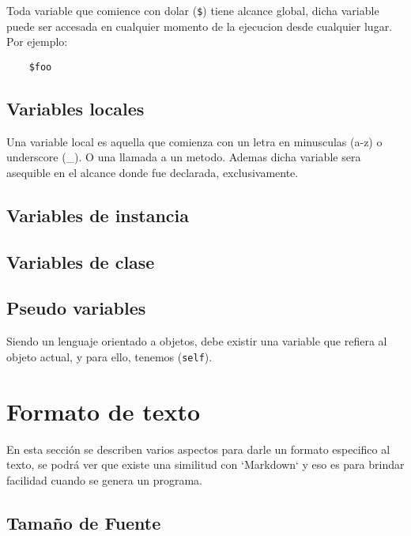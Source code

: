 \documentclass[12pt,letterpaper,titlepage,oneside,openright]{book}
\newcommand{\ttcode}[1]{(\texttt{#1})}
\begin{document}
Toda variable que comience con dolar \ttcode{\$} tiene alcance global, dicha
variable puede ser accesada en cualquier momento de la ejecucion desde cualquier
lugar. Por ejemplo:

\begin{center}
\begin{lstlisting}
    $foo
\end{lstlisting}
\end{center}

\subsection{Variables locales}

Una variable local es aquella que comienza con un letra en minusculas (a-z) o
underscore (\_). O una llamada a un metodo. Ademas dicha variable sera asequible
en el alcance donde fue declarada, exclusivamente.

\subsection{Variables de instancia}


\subsection{Variables de clase}


\subsection{Pseudo variables}

Siendo un lenguaje orientado a objetos, debe existir una variable que refiera al
objeto actual, y para ello, tenemos \ttcode{self}.

\section{Formato de texto}

En esta sección se describen varios aspectos para darle un formato especifico al
texto, se podrá ver que existe una similitud con `Markdown` y eso es para
brindar facilidad cuando se genera un programa.

\subsection{Tamaño de Fuente}
\end{document}
